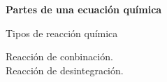 \begin{warncard}
    \begin{center}\bfseries
        Partes de una ecuación química


        Tipos de reacción química
    \end{center}
     Reacción de conbinación.\\
     Reacción de desintegración.

\end{warncard}